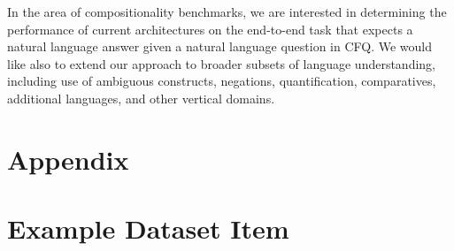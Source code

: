 \documentclass[letterpaper]{article}
\begin{document}
In the area of compositionality benchmarks, we are interested in determining the performance of current architectures on the end-to-end task that expects a natural language answer given a natural language question in CFQ. We would like also to extend our approach to broader subsets of language understanding, including use of ambiguous constructs, negations, quantification, comparatives, additional languages, and other vertical domains.





\clearpage
\appendix
\section*{Appendix}

\setcounter{topnumber}{5}
\setcounter{bottomnumber}{5}
\setcounter{totalnumber}{10}
\renewcommand{\topfraction}{0.9}
\renewcommand{\bottomfraction}{0.9}
\renewcommand{\textfraction}{0.1}
\renewcommand{\floatpagefraction}{0.9}


\section{Example Dataset Item}
\label{suppl:item}
\end{document}

